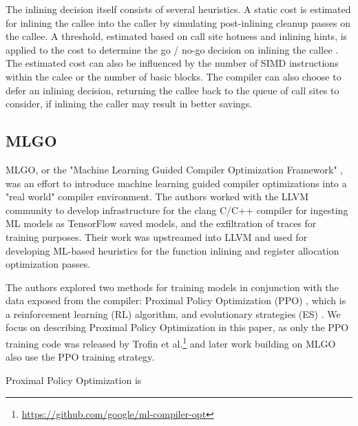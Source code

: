 \documentclass[nohyperref]{article}
\theoremstyle{plain}
\theoremstyle{definition}
\theoremstyle{remark}
\begin{document}
The inlining decision itself consists of several heuristics. A static cost is estimated for inlining the callee into the caller by simulating post-inlining cleanup passes on the callee. A threshold, estimated based on call site hotness and inlining hints, is applied to the cost to determine the go / no-go decision on inlining the callee \cite{mlgo}. The estimated cost can also be influenced by the number of SIMD instructions within the calee or the number of basic blocks. The compiler can also choose to defer an inlining decision, returning the callee back to the queue of call sites to consider, if inlining the caller may result in better savings.



\subsection{MLGO}
MLGO, or the "Machine Learning Guided Compiler Optimization Framework" \cite{mlgo}, was an effort to introduce machine learning guided compiler optimizations into a "real world" compiler environment. The authors worked with the LLVM community to develop infrastructure for the clang C/C++ compiler for ingesting ML models as TensorFlow saved models, and the exfiltration of traces for training purposes. Their work was upstreamed into LLVM and used for developing ML-based heuristics for the function inlining and register allocation optimization passes.

The authors explored two methods for training models in conjunction with the data exposed from the compiler: Proximal Policy Optimization (PPO) \cite{schulman2017proximal}, which is a reinforcement learning (RL) algorithm, and evolutionary strategies (ES) \cite{salimans2017evolution}. We focus on describing Proximal Policy Optimization in this paper, as only the PPO training code was released by Trofin et al.\footnote{\href{https://github.com/google/ml-compiler-opt}{https://github.com/google/ml-compiler-opt}} and later work building on MLGO also use the PPO training strategy.

Proximal Policy Optimization is 
\end{document}
